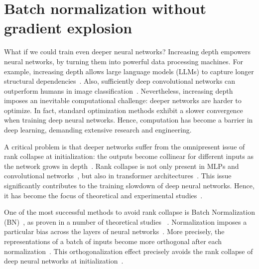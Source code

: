 

\chapter{Batch normalization without gradient explosion}\label{ch:bn_grad}

What if we could train even deeper neural networks? Increasing depth empowers neural networks, by turning them into powerful data processing machines. For example, increasing depth allows large language models (LLMs) to capture longer structural dependencies~\citep{devlin2018bert,liu2019roberta,brown2020language,goyal2021larger,raffel2020exploring}. Also, sufficiently deep convolutional networks can outperform humans in image classification~\citep{liu2022convnet,woo2023convnext,wu2021cvt}. Nevertheless, increasing depth imposes an inevitable computational challenge: deeper networks are harder to optimize. In fact, standard optimization methods exhibit a slower convergence when training deep neural networks. Hence, computation has become a barrier in deep learning, demanding extensive research and engineering. 

A critical problem is that deeper networks suffer from the omnipresent issue of rank collapse at initialization: the outputs become collinear for different inputs as the network grows in depth~\citep{saxe2013exact}. Rank collapse is not only present in MLPs and convolutional networks~\citep{feng2022rank,saxe2013exact,daneshmand2020batch}, but also in transformer architectures~\citep{dong2021attention, noci2022signal}. This issue significantly contributes to the training slowdown of deep neural networks. Hence, it has become the focus of theoretical and experimental studies~\citep{saxe2013exact,feng2022rank,daneshmand2021batch,noci2022signal}.  

One of the most successful methods to avoid rank collapse is Batch Normalization (BN)~\citep{ioffe2015batch}, as proven in a number of theoretical studies ~\citep{yang2018a, daneshmand2020batch, daneshmand2021batch}. Normalization imposes a particular bias across the layers of neural networks~\citep{joudaki2023impact}. More precisely, the representations of a batch of inputs become more orthogonal after each normalization~\citep{joudaki2023impact}. This orthogonalization effect precisely avoids the rank collapse of deep neural networks at initialization~\citep{yang2018a,joudaki2023impact,daneshmand2021batch,joudaki2023bridging}. 

